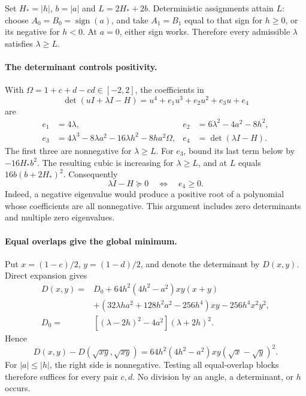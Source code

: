 \documentclass[11pt]{article}
\begin{document}
Set \(H_*=|h|\), \(b=|a|\) and \(L=2H_*+2b\).
Deterministic assignments attain \(L\): choose \(A_0=B_0=\operatorname{sign}(a)\),
and take \(A_1=B_1\) equal to that sign for \(h\ge0\), or its negative for \(h<0\).
At \(a=0\), either sign works. Therefore every admissible \(\lambda\) satisfies
\(\lambda\ge L\).

\paragraph{The determinant controls positivity.}
With \(\Omega=1+c+d-cd\in[-2,2]\), the coefficients in
\[
 \det(uI+\lambda I-H)=u^4+e_1u^3+e_2u^2+e_3u+e_4
\]
are
\begin{align*}
 e_1&=4\lambda,&
 e_2&=6\lambda^2-4a^2-8h^2,\\
 e_3&=4\lambda^3-8\lambda a^2-16\lambda h^2-8ha^2\Omega,
 &e_4&=\det(\lambda I-H).
\end{align*}
The first three are nonnegative for \(\lambda\ge L\).
For \(e_3\), bound its last term below by \(-16H_*b^2\).
The resulting cubic is increasing for \(\lambda\ge L\), and at \(L\) equals
\(16b(b+2H_*)^2\).
Consequently
\[
 \lambda I-H\succeq0\quad\Longleftrightarrow\quad e_4\ge0 .
\]
Indeed, a negative eigenvalue would produce a positive root of a polynomial
whose coefficients are all nonnegative. This argument includes zero determinants
and multiple zero eigenvalues.

\paragraph{Equal overlaps give the global minimum.}
Put \(x=(1-c)/2\), \(y=(1-d)/2\), and denote the determinant by \(D(x,y)\).
Direct expansion gives
\begin{align*}
D(x,y)={}&D_0+64h^2(4h^2-a^2)xy(x+y)\\
 &+(32\lambda ha^2+128h^2a^2-256h^4)xy-256h^4x^2y^2,\\
D_0={}&[(\lambda-2h)^2-4a^2](\lambda+2h)^2.
\end{align*}
Hence
\begin{equation}
 D(x,y)-D(\sqrt{xy},\sqrt{xy})
 =64h^2(4h^2-a^2)xy(\sqrt x-\sqrt y)^2 .
 \label{eq:diagonal}
\end{equation}
For \(|a|\le |h|\), the right side is nonnegative. Testing all equal-overlap
blocks therefore suffices for every pair \(c,d\). No division by an angle,
a determinant, or \(h\) occurs.
\end{document}
